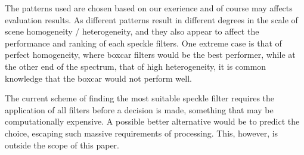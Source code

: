 \documentclass[journal]{IEEEtran}
\begin{document}
The patterns used are chosen based on our exerience and of course may affects evaluation results. 
As different patterns result in different degrees in the scale of scene homogeneity / heterogeneity, 
	and they also appear to affect the performance and ranking of each speckle filters.
One extreme case is that of perfect homogeneity, where boxcar filters would be the best performer,
	while at the other end of the spectrum, that of high heterogeneity, it is common knowledge that the boxcar would not perform well.



The current scheme of finding the most suitable speckle filter requires the application of all filters before a decision is made, something that may be computationally expensive.
A possible better alternative would be to predict the choice, escaping such massive requirements of processing.
This, however, is outside the scope of this paper.
\end{document}
